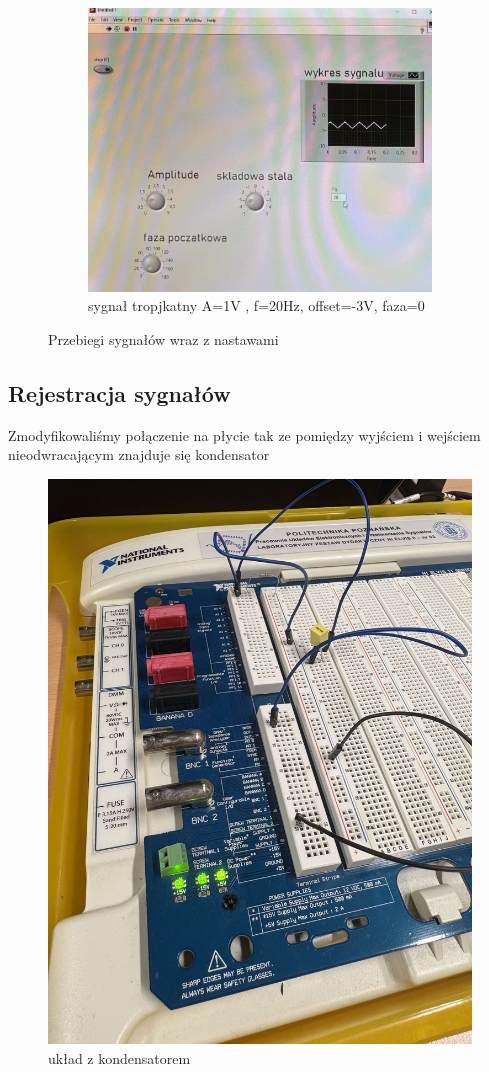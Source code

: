 \documentclass[11pt]{article}
\begin{document}
\begin{figure}[H]
\begin{subfigure}{.48\textwidth}
    \label{fig:sub2}
  \end{subfigure}
  \begin{subfigure}{.48\textwidth}
    \centering
    \includegraphics[width=\linewidth]{img/obraz4.jpg}
    \caption{sygnał tropjkatny A=1V , f=20Hz, offset=-3V, faza=0\degree}
    \label{fig:sub3}
  \end{subfigure}

  \caption{Przebiegi sygnałów wraz z nastawami}
  \label{fig:przebiegi}
\end{figure}


\subsection{Rejestracja sygnałów}
Zmodyfikowaliśmy połączenie na płycie tak ze pomiędzy wyjściem i wejściem nieodwracającym znajduje się kondensator 

\begin{figure}[H]
    \centering
    \includegraphics[width=0.3\linewidth]{img/obraz5.jpg}
    \caption{układ z kondensatorem}
    \label{fig:placeholder}
\end{figure}
\end{document}
